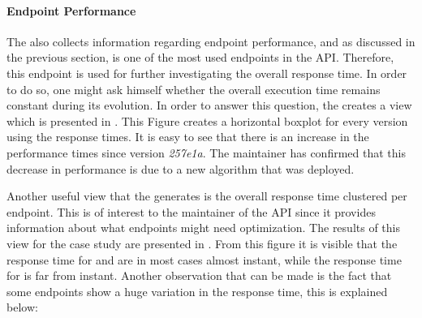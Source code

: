 \documentclass[conference]{IEEEtran}
\begin{document}


\paragraph{Endpoint Performance}
\label{sec:perf}
The \tool also collects information regarding endpoint performance, and as discussed in the previous section, \epTranslations is one of the most used endpoints in the API. Therefore, this endpoint is used for further investigating the overall response time. In order to do so, one might ask himself whether the overall execution time remains constant during its evolution. In order to answer this question, the \tool creates a view which is presented in . This Figure creates a horizontal boxplot for every version using the response times. It is easy to see that there is an increase in the performance times since version {\em 257e1a}. The maintainer has confirmed that this decrease in performance is due to a new algorithm that was deployed.

Another useful view that the \tool generates is the overall response time clustered per endpoint. This is of interest to the maintainer of the API since it provides information about what endpoints might need optimization. The results of this view for the case study are presented in . From this figure it is visible that the response time for \epLearnedLanguage and \epOutcome are in most cases almost instant, while the response time for \epTranslations is far from instant. Another observation that can be made is the fact that some endpoints show a huge variation in the response time, this is explained below:
\end{document}
